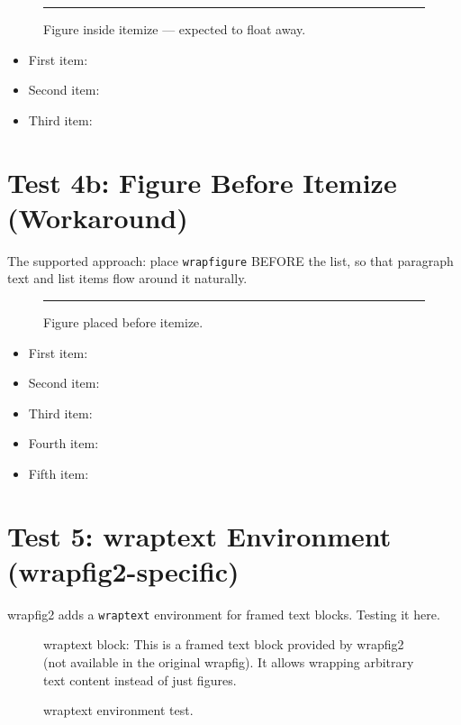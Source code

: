 \documentclass[a4paper,11pt]{article}
\begin{document}
\begin{figure}
  \centering
  \rule{0.3\textwidth}{3cm}
  \caption{Figure inside itemize --- expected to float away.}
  \label{fig:itemize-fail}
\end{figure}

\begin{itemize}
  \item First item: \lipsum[1][1-3]
  \item Second item: \lipsum[2][1-3]
  \item Third item: \lipsum[3][1-3]
\end{itemize}

\section*{Test 4b: Figure Before Itemize (Workaround)}
The supported approach: place \texttt{wrapfigure} BEFORE the list, so that
paragraph text and list items flow around it naturally.

\begin{figure}
  \centering
  \rule{0.3\textwidth}{4cm}
  \caption{Figure placed before itemize.}
  \label{fig:before-itemize}
\end{figure}

\lipsum[1][1-2]
\begin{itemize}
  \item First item: \lipsum[2][1-3]
  \item Second item: \lipsum[3][1-3]
  \item Third item: \lipsum[4][1-3]
  \item Fourth item: \lipsum[5][1-3]
\item Fifth item: \lipsum[6][1-3]
\end{itemize}

\section*{Test 5: wraptext Environment (wrapfig2-specific)}
wrapfig2 adds a \texttt{wraptext} environment for framed text blocks. Testing it here.

\begin{figure}
  \begin{wraptext}
    wraptext block: This is a framed text block provided by wrapfig2 (not
    available in the original wrapfig). It allows wrapping arbitrary text
    content instead of just figures.
  \end{wraptext}
  \caption{wraptext environment test.}
  \label{fig:wraptext}
\end{figure}

\lipsum[6-7]
\end{document}
